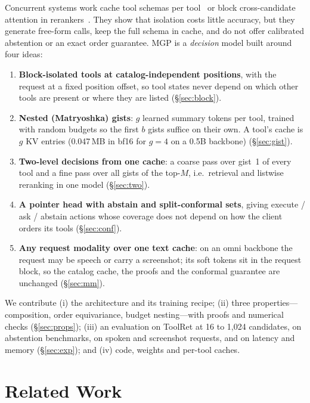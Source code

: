 \documentclass[sigconf,review,anonymous]{acmart}
\newcommand{\method}{MGP}
\begin{document}
Concurrent systems work cache tool schemas per tool~\cite{fang2026recache,arslan2026nexus} or block cross-candidate attention in rerankers~\cite{bito2026invarirank,schlatt2025setencoder}.
They show that isolation costs little accuracy, but they generate free-form calls, keep the full schema in cache, and do not offer calibrated abstention or an exact order guarantee.
\method{} is a \emph{decision} model built around four ideas:
\begin{enumerate}
  \item \textbf{Block-isolated tools at catalog-independent positions}, with the request at a fixed position offset, so tool states never depend on which other tools are present or where they are listed (\S\ref{sec:block}).
  \item \textbf{Nested (Matryoshka) gists}: $g$ learned summary tokens per tool, trained with random budgets so the first $b$ gists suffice on their own. A tool's cache is $g$ KV entries (0.047\,MB in bf16 for $g{=}4$ on a 0.5B backbone) (\S\ref{sec:gist}).
  \item \textbf{Two-level decisions from one cache}: a coarse pass over gist~1 of every tool and a fine pass over all gists of the top-$M$, i.e.\ retrieval and listwise reranking in one model (\S\ref{sec:two}).
  \item \textbf{A pointer head with abstain and split-conformal sets}, giving execute / ask / abstain actions whose coverage does not depend on how the client orders its tools (\S\ref{sec:conf}).
  \item \textbf{Any request modality over one text cache}: on an omni backbone the request may be speech or carry a screenshot; its soft tokens sit in the request block, so the catalog cache, the proofs and the conformal guarantee are unchanged (\S\ref{sec:mm}).
\end{enumerate}
We contribute (i) the architecture and its training recipe; (ii) three properties---composition, order equivariance, budget nesting---with proofs and numerical checks (\S\ref{sec:props}); (iii) an evaluation on ToolRet at 16 to 1{,}024 candidates, on abstention benchmarks, on spoken and screenshot requests, and on latency and memory (\S\ref{sec:exp}); and (iv) code, weights and per-tool caches.

\section{Related Work}\label{sec:related}
\end{document}
